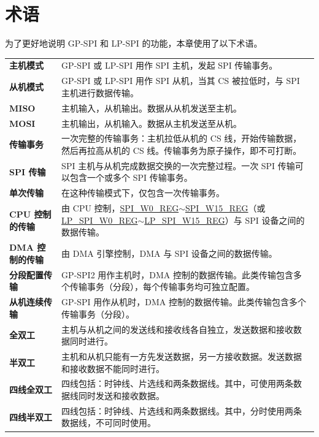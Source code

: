 \section{术语}

为了更好地说明 GP-SPI 和 LP-SPI 的功能，本章使用了以下术语。 

\begin{longtable}[c]{ R{4cm} p{10cm} }

\textbf{主机模式}     & GP-SPI 或 LP-SPI 用作 SPI 主机，发起 SPI 传输事务。\\ 
\textbf{从机模式}      & GP-SPI 或 LP-SPI 用作 SPI 从机，当其 CS 被拉低时，与 SPI 主机进行数据传输。\\
\textbf{MISO}       & 主机输入，从机输出。数据从从机发送至主机。\\
\textbf{MOSI}  & 主机输出，从机输入。数据从主机发送至从机。\\ 
\textbf{传输事务} & 一次完整的传输事务：主机拉低从机的 CS 线，开始传输数据，然后再拉高从机的 CS 线。传输事务为原子操作，即不可打断。\\
\textbf{SPI 传输} & SPI 主机与从机完成数据交换的一次完整过程。一次 SPI 传输可以包含一个或多个 SPI 传输事务。\\
\textbf{单次传输} & 在这种传输模式下，仅包含一次传输事务。\\
\textbf{CPU 控制的传输}& 由 CPU 控制，\hyperref[regdesc:SPIW0REG]{SPI\_W0\_REG}$\sim$\hyperref[regdesc:SPIW15REG]{SPI\_W15\_REG}（或 \hyperref[regdesc:LPSPIW0REG]{LP\_SPI\_W0\_REG}$\sim$\hyperref[regdesc:LPSPIW15REG]{LP\_SPI\_W15\_REG}）与 SPI 设备之间的数据传输。\\
\textbf{DMA 控制的传输}& 由 DMA 引擎控制，DMA 与 SPI 设备之间的数据传输。\\
\textbf{分段配置传输}& GP-SPI2 用作主机时，DMA 控制的数据传输。此类传输包含多个传输事务（分段），每个传输事务均可独立配置。\\
\textbf{从机连续传输} & GP-SPI 用作从机时，DMA 控制的数据传输。此类传输包含多个传输事务（分段）。\\
\textbf{全双工} & 主机与从机之间的发送线和接收线各自独立，发送数据和接收数据同时进行。\\
\textbf{半双工} & 主机和从机只能有一方先发送数据，另一方接收数据。发送数据和接收数据不能同时进行。\\
\textbf{四线全双工} & 四线包括：时钟线、片选线和两条数据线。其中，可使用两条数据线同时发送和接收数据。\\
\textbf{四线半双工} & 四线包括：时钟线、片选线和两条数据线。其中，分时使用两条数据线，不可同时使用。\\

\end{longtable}
